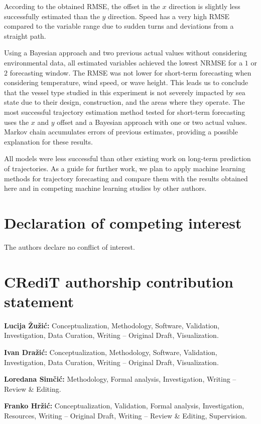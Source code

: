 \documentclass[preprint,12pt]{elsarticle}
\begin{document}
According to the obtained RMSE, the offset in the $x$ direction is slightly less successfully estimated than the $y$ direction. Speed has a very high RMSE compared to the variable range due to sudden turns and deviations from a straight path.

Using a Bayesian approach and two previous actual values without considering environmental data, all estimated variables achieved the lowest NRMSE for a $1$ or $2$ forecasting window. The RMSE was not lower for short-term forecasting when considering temperature, wind speed, or wave height. This leads us to conclude that the vessel type studied in this experiment is not severely impacted by sea state due to their design, construction, and the areas where they operate. The most successful trajectory estimation method tested for short-term forecasting uses the $x$ and $y$ offset and a Bayesian approach with one or two actual values. Markov chain accumulates errors of previous estimates, providing a possible explanation for these results. 

All models were less successful than other existing work on long-term prediction of trajectories. As a guide for further work, we plan to apply machine learning methods for trajectory forecasting and compare them with the results obtained here and in competing machine learning studies by other authors.

\section*{Declaration of competing interest}
The authors declare no conflict of interest.

\section*{CRediT authorship contribution statement}

\textbf{Lucija \v{Z}u\v{z}i\'{c}:} Conceptualization, Methodology, Software, Validation, Investigation, Data Curation, Writing -- Original Draft, Visualization.

\textbf{Ivan Dra\v{z}i\'{c}:} Conceptualization, Methodology, Software, Validation, Investigation, Data Curation, Writing -- Original Draft, Visualization.

\textbf{Loredana Sim\v{c}i\'{c}:} Methodology, Formal analysis, Investigation, Writing -- Review \& Editing.

\textbf{Franko Hr\v{z}i\'{c}:} Conceptualization, Validation, Formal analysis, Investigation, Resources, Writing -- Original Draft, Writing -- Review \& Editing, Supervision.
\end{document}
